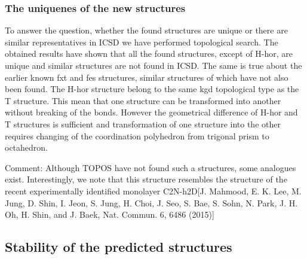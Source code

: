 \documentclass[a4paperm]{article}
\begin{document}
\subsubsection{The uniquenes of the new structures}

To answer the question, whether the found structures are unique or there are similar representatives in ICSD we have performed topological search.
The obtained results have shown that all the found structures, except of H-hor, are unique and similar structures are not found in ICSD.
The same is true about the earlier known fxt and fes structures, similar structures of which have not also been found. 
The H-hor structure belong to the same kgd topological type as the T structure.
This mean that one structure can be transformed into another without breaking of the bonds.
However the geometrical difference of H-hor and T structures is sufficient and transformation of one structure into the other requires changing of the coordination polyhedron from trigonal prism to octahedron.

Comment:
Although TOPOS have not found such a structures, some analogues exist.
Interestingly, we note that this structure resembles the structure of the recent experimentally identified monolayer C2N-h2D[J. Mahmood, E. K. Lee, M. Jung, D. Shin, I. Jeon, S. Jung, H. Choi, J. Seo, S. Bae, S. Sohn, N. Park, J. H. Oh, H. Shin, and J.
Baek, Nat. Commun. 6, 6486 (2015)]

\subsection{Stability of the predicted structures}

\end{document}
